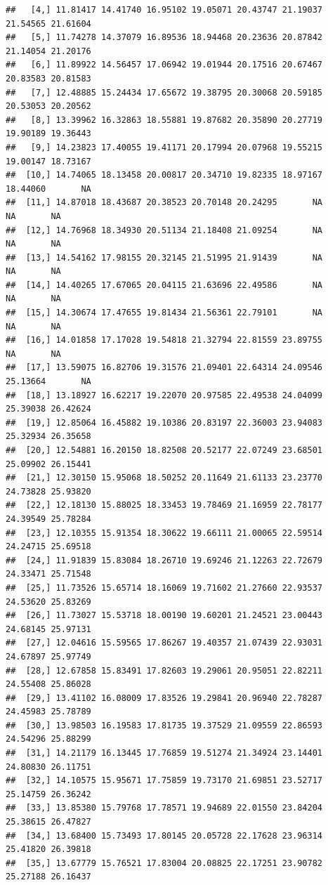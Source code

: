 \documentclass{article}\usepackage[]{graphicx}\usepackage[]{color}
\makeatletter
\newenvironment{kframe}{%
 \def\at@end@of@kframe{}%
 \ifinner\ifhmode%
  \def\at@end@of@kframe{\end{minipage}}%
  \begin{minipage}{\columnwidth}%
 \fi\fi%
 \def\FrameCommand##1{\hskip\@totalleftmargin \hskip-\fboxsep
 \colorbox{shadecolor}{##1}\hskip-\fboxsep
     \hskip-\linewidth \hskip-\@totalleftmargin \hskip\columnwidth}%
 \MakeFramed {\advance\hsize-\width
   \@totalleftmargin\z@ \linewidth\hsize
   \@setminipage}}%
 {\par\unskip\endMakeFramed%
 \at@end@of@kframe}
\newenvironment{knitrout}{}{} %
\makeatother
\begin{document}
\begin{knitrout}
\begin{kframe}
\begin{verbatim}
##   [4,] 11.81417 14.41740 16.95102 19.05071 20.43747 21.19037 21.54565 21.61604
##   [5,] 11.74278 14.37079 16.89536 18.94468 20.23636 20.87842 21.14054 21.20176
##   [6,] 11.89922 14.56457 17.06942 19.01944 20.17516 20.67467 20.83583 20.81583
##   [7,] 12.48885 15.24434 17.65672 19.38795 20.30068 20.59185 20.53053 20.20562
##   [8,] 13.39962 16.32863 18.55881 19.87682 20.35890 20.27719 19.90189 19.36443
##   [9,] 14.23823 17.40055 19.41171 20.17994 20.07968 19.55215 19.00147 18.73167
##  [10,] 14.74065 18.13458 20.00817 20.34710 19.82335 18.97167 18.44060       NA
##  [11,] 14.87018 18.43687 20.38523 20.70148 20.24295       NA       NA       NA
##  [12,] 14.76968 18.34930 20.51134 21.18408 21.09254       NA       NA       NA
##  [13,] 14.54162 17.98155 20.32145 21.51995 21.91439       NA       NA       NA
##  [14,] 14.40265 17.67065 20.04115 21.63696 22.49586       NA       NA       NA
##  [15,] 14.30674 17.47655 19.81434 21.56361 22.79101       NA       NA       NA
##  [16,] 14.01858 17.17028 19.54818 21.32794 22.81559 23.89755       NA       NA
##  [17,] 13.59075 16.82706 19.31576 21.09401 22.64314 24.09546 25.13664       NA
##  [18,] 13.18927 16.62217 19.22070 20.97585 22.49538 24.04099 25.39038 26.42624
##  [19,] 12.85064 16.45882 19.10386 20.83197 22.36003 23.94083 25.32934 26.35658
##  [20,] 12.54881 16.20150 18.82508 20.52177 22.07249 23.68501 25.09902 26.15441
##  [21,] 12.30150 15.95068 18.50252 20.11649 21.61133 23.23770 24.73828 25.93820
##  [22,] 12.18130 15.88025 18.33453 19.78469 21.16959 22.78177 24.39549 25.78284
##  [23,] 12.10355 15.91354 18.30622 19.66111 21.00065 22.59514 24.24715 25.69518
##  [24,] 11.91839 15.83084 18.26710 19.69246 21.12263 22.72679 24.33471 25.71548
##  [25,] 11.73526 15.65714 18.16069 19.71602 21.27660 22.93537 24.53620 25.83269
##  [26,] 11.73027 15.53718 18.00190 19.60201 21.24521 23.00443 24.68145 25.97131
##  [27,] 12.04616 15.59565 17.86267 19.40357 21.07439 22.93031 24.67897 25.97749
##  [28,] 12.67858 15.83491 17.82603 19.29061 20.95051 22.82211 24.55408 25.86028
##  [29,] 13.41102 16.08009 17.83526 19.29841 20.96940 22.78287 24.45983 25.78789
##  [30,] 13.98503 16.19583 17.81735 19.37529 21.09559 22.86593 24.54296 25.88299
##  [31,] 14.21179 16.13445 17.76859 19.51274 21.34924 23.14401 24.80830 26.11751
##  [32,] 14.10575 15.95671 17.75859 19.73170 21.69851 23.52717 25.14759 26.36242
##  [33,] 13.85380 15.79768 17.78571 19.94689 22.01550 23.84204 25.38615 26.47827
##  [34,] 13.68400 15.73493 17.80145 20.05728 22.17628 23.96314 25.41820 26.39818
##  [35,] 13.67779 15.76521 17.83004 20.08825 22.17251 23.90782 25.27188 26.16437

\end{verbatim}
\end{kframe}
\end{knitrout}
\end{document}
